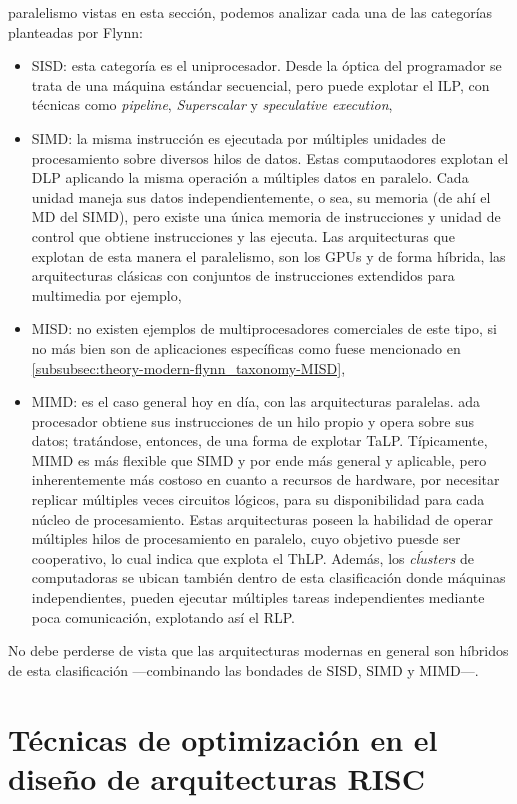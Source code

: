 paralelismo vistas en esta sección, podemos analizar cada una de las categorías 
planteadas por Flynn:
\begin{itemize}
  \item SISD: esta categoría es el uniprocesador. Desde la óptica del 
programador se trata de una máquina estándar secuencial, pero puede explotar el 
ILP, con técnicas como \emph{pipeline}, \emph{Superscalar} y \emph{speculative 
execution},
  \item SIMD: la misma instrucción es ejecutada por múltiples unidades de 
procesamiento sobre diversos hilos de datos. Estas computaodores explotan el 
DLP aplicando la misma operación a múltiples datos en paralelo. Cada unidad 
maneja sus datos independientemente, o sea, su memoria (de ahí el MD del SIMD), 
pero existe una única memoria de instrucciones y unidad de control que obtiene 
instrucciones y las ejecuta. Las arquitecturas que explotan de esta manera el 
paralelismo, son los GPUs y de forma híbrida, las arquitecturas clásicas con 
conjuntos de instrucciones extendidos para multimedia por ejemplo,
  \item MISD: no existen ejemplos de multiprocesadores comerciales de este 
tipo, si no más bien son de aplicaciones específicas como fuese mencionado en 
\ref{subsubsec:theory-modern-flynn_taxonomy-MISD},
  \item MIMD: es el caso general hoy en día, con las arquitecturas paralelas. 
ada procesador obtiene sus instrucciones de un hilo propio y opera sobre sus 
datos; tratándose, entonces, de una forma de explotar TaLP. Típicamente, MIMD 
es más flexible que SIMD y por ende más general y aplicable, pero 
inherentemente 
más costoso en cuanto a recursos de hardware, por necesitar replicar múltiples 
veces circuitos lógicos, para su disponibilidad para cada núcleo de 
procesamiento. Estas arquitecturas poseen la habilidad de operar múltiples 
hilos 
de procesamiento en paralelo, cuyo objetivo puesde ser cooperativo, lo cual 
indica que explota el ThLP. Además, los \emph{cĺusters} de computadoras se 
ubican también dentro de esta clasificación donde máquinas independientes, 
pueden ejecutar múltiples tareas independientes mediante poca comunicación, 
explotando así el RLP.
\end{itemize}
No debe perderse de vista que las arquitecturas modernas en general son 
híbridos de esta clasificación ---combinando las bondades de SISD, SIMD y 
MIMD---.

\section{Técnicas de optimización en el diseño de arquitecturas RISC}
\label{sec:optimizations}

